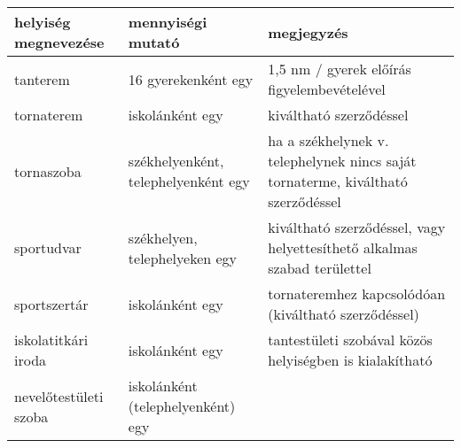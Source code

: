 \begin{longtable}{@{}p{4cm}|p{4cm}|p{6cm}@{}}

    \textbf{helyiség megnevezése} & \textbf{mennyiségi mutató}
                                  & \textbf{megjegyzés}
    \\ \hline
    tanterem                      & 16 gyerekenként egy                 &
    1,5 nm /
    gyerek előírás figyelembevételével
    \\ \hline
    tornaterem                    & iskolánként egy                     &
    kiváltható
    szerződéssel
    \\ \hline
    tornaszoba                    & székhelyenként, telephelyenként egy &
    ha a
    székhelynek v. telephelynek nincs saját tornaterme, kiváltható szerződéssel
    \\ \hline
    sportudvar                    & székhelyen, telephelyeken egy       &
    kiváltható
    szerződéssel, vagy helyettesíthető alkalmas szabad területtel
    \\ \hline
    sportszertár                  & iskolánként egy                     &
    tornateremhez kapcsolódóan (kiváltható szerződéssel)
    \\ \hline
    iskolatitkári iroda           & iskolánként egy                     &
    tantestületi szobával közös helyiségben  is kialakítható
    \\ \hline
    nevelőtestületi szoba         & iskolánként (telephelyenként) egy   &


\end{longtable}
